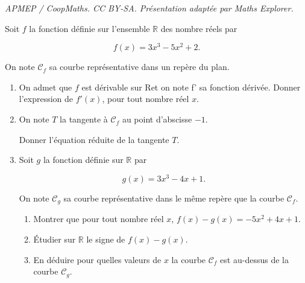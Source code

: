 \documentclass[10pt]{article}
\providecommand{\R}{\mathbb{R}}
\begin{document}
\noindent\textit{APMEP / CoopMaths. CC BY-SA. Présentation adaptée par Maths Explorer.}\par\medskip
\medskip

 
Soit $f$ la fonction définie sur l'ensemble $\R$ des nombre réels par 

\[f(x) = 3x^3 - 5x^2 + 2.\]

On note $\mathcal{C}_f$ sa courbe représentative dans un repère du plan.

\medskip

\begin{enumerate}
\item On admet que $f$ est dérivable sur Ret on note f' sa fonction dérivée.
Donner l'expression de $f'(x)$, pour tout nombre réel $x$.
\item On note $T$ la tangente à $\mathcal{C}_f$ au point d'abscisse $- 1$.

Donner l'équation réduite de la tangente $T$.
\item  Soit $g$ la fonction définie sur $\R$ par 

\[g(x) = 3x^3 - 4x + 1.\]

On note $\mathcal{C}_g$ sa courbe représentative dans le même repère que la courbe $\mathcal{C}_f$. 
	\begin{enumerate}
		\item Montrer que pour tout nombre réel $x$, \:$f(x) - g(x) = -5x^2 + 4x + 1$.
		\item Étudier sur $\R$ le signe de $f(x) - g(x)$.
		\item En déduire pour quelles valeurs de $x$ la courbe $\mathcal{C}_f$ est au-dessus de la courbe $\mathcal{C}_g$.
	\end{enumerate}
\end{enumerate}
\end{document}
